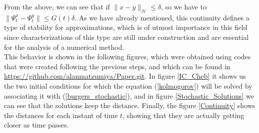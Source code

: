 	From the above, we can see that if $ \| x - y \|_{\mathcal{H}} \leq \delta$, so we have to $\| \Psi^x_t - \Psi^y_t \| \leq G (t) \delta$. As we have already mentioned, this continuity defines a type of stability for approximations, which is of utmost importance in this field since characterizations of this type are still under construction and are essential for the analysis of a numerical method. \\
	
	This behavior is shown in the following figures, which were obtained using codes that were created following the previous steps, and which can be found in \url{https://github.com/alanmatzumiya/Paper.git}. In figure \ref{IC_Cheb} it shows us the two initial conditions for which the equation (\ref{kolmogorov}) will be solved by associating it with (\ref{burgers_stochastic}), and in figure \ref{Stochastic_Solutions} we can see that the solutions keep the distance. Finally, the figure \ref{Continuity} shows the distances for each instant of time $t$, showing that they are actually getting closer as time passes.
	
